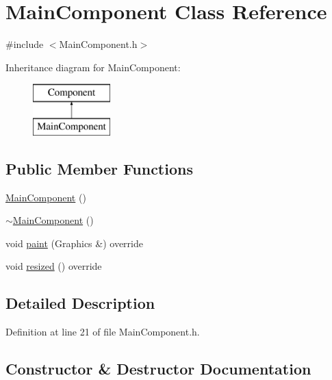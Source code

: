 \hypertarget{class_main_component}{}\section{Main\+Component Class Reference}
\label{class_main_component}


{\ttfamily \#include $<$Main\+Component.\+h$>$}

Inheritance diagram for Main\+Component\+:\begin{figure}[H]
\begin{center}
\leavevmode
\includegraphics[height=2.000000cm]{class_main_component}
\end{center}
\end{figure}
\subsection*{Public Member Functions}
\begin{DoxyCompactItemize}
\item 
\mbox{\hyperlink{class_main_component_a85254935b98beac9128189c6a577d7be}{Main\+Component}} ()
\item 
\mbox{\hyperlink{class_main_component_aa96a2a286f35edf4000deec5f327d1c3}{$\sim$\+Main\+Component}} ()
\item 
void \mbox{\hyperlink{class_main_component_a413e9316a0332e0522ad69d4f714bfcd}{paint}} (Graphics \&) override
\item 
void \mbox{\hyperlink{class_main_component_a339148bc43089300e10d5883a0a80726}{resized}} () override
\end{DoxyCompactItemize}


\subsection{Detailed Description}


Definition at line 21 of file Main\+Component.\+h.



\subsection{Constructor \& Destructor Documentation}
\mbox{\label{class_main_component_a85254935b98beac9128189c6a577d7be}} 
